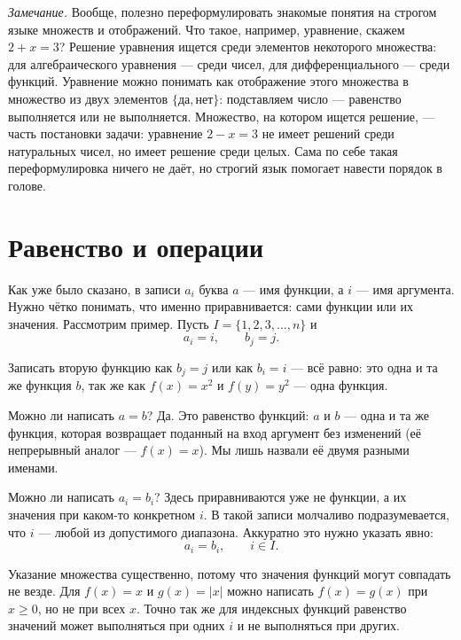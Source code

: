 \documentclass[11pt,a4paper]{article}
\begin{document}
\emph{Замечание.} Вообще, полезно переформулировать знакомые понятия на строгом языке множеств и отображений. Что такое, например, уравнение, скажем $2 + x = 3$? Решение уравнения ищется среди элементов некоторого множества: для алгебраического уравнения — среди чисел, для дифференциального — среди функций. Уравнение можно понимать как отображение этого множества в множество из двух элементов $\{\text{да}, \text{нет}\}$: подставляем число — равенство выполняется или не выполняется. Множество, на котором ищется решение, — часть постановки задачи: уравнение $2 - x = 3$ не имеет решений среди натуральных чисел, но имеет решение среди целых. Сама по себе такая переформулировка ничего не даёт, но строгий язык помогает навести порядок в голове.


\section{Равенство и операции}

Как уже было сказано, в записи $a_i$ буква $a$ — имя функции, а $i$ — имя аргумента. Нужно чётко понимать, что именно приравнивается: сами функции или их значения. Рассмотрим пример. Пусть $I = \{1, 2, 3, \dots, n\}$ и
\[
a_i = i, \qquad b_j = j.
\]

Записать вторую функцию как $b_j = j$ или как $b_i = i$ — всё равно: это одна и та же функция $b$, так же как $f(x) = x^2$ и $f(y) = y^2$ — одна функция.

Можно ли написать $a = b$? Да. Это равенство функций: $a$ и $b$ — одна и та же функция, которая возвращает поданный на вход аргумент без изменений (её непрерывный аналог — $f(x) = x$). Мы лишь назвали её двумя разными именами.

Можно ли написать $a_i = b_i$? Здесь приравниваются уже не функции, а их значения при каком-то конкретном $i$. В такой записи молчаливо подразумевается, что $i$ — любой из допустимого диапазона. Аккуратно это нужно указать явно:
\[
a_i = b_i, \qquad i \in I.
\]

Указание множества существенно, потому что значения функций могут совпадать не везде. Для $f(x) = x$ и $g(x) = |x|$ можно написать $f(x) = g(x)$ при $x \geqslant 0$, но не при всех $x$. Точно так же для индексных функций равенство значений может выполняться при одних $i$ и не выполняться при других.
\end{document}
